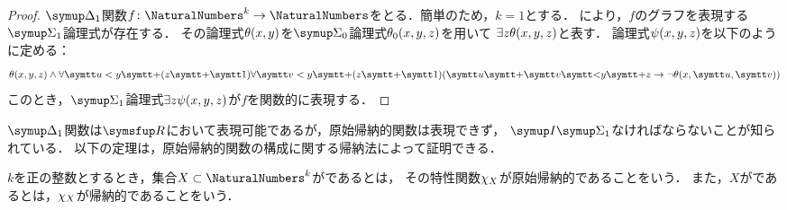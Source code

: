 
\begin{proof}
	\(\DeltaFormula_1\)関数\(f \colon \NaturalNumbers^k \to \NaturalNumbers\)をとる．簡単のため，\(k = 1\)とする．
	により，\(f\)のグラフを表現する\(\SigmaFormula_1\)論理式が存在する．
	その論理式\(\apply{\theta}{x, y}\)を\(\SigmaFormula_0\)論理式\(\apply{\theta_0}{x, y, z}\)を用いて
	\(\exists z \apply{\theta}{x, y, z}\)と表す．
	論理式\(\apply{\psi}{x, y, z}\)を以下のように定める：
	\[
		\apply{\theta}{x, y, z} \land \forall \obj{u} < y \obj{+} \paren{z \obj{+} \obj{1}} \forall \obj{v} < y \obj{+} \paren{z \obj{+} \obj{1}}
		\paren{\obj{u} \obj{+} \obj{v} \obj{<} y \obj{+} z \to \lnot \apply{\theta}{x, \obj{u}, \obj{v}}}
	\]
	このとき，\(\SigmaFormula_1\)論理式\(\exists z \apply{\psi}{x, y, z}\)が\(f\)を関数的に表現する．
\end{proof}

\(\DeltaFormula_1\)関数は\(\RArithmetic\)において表現可能であるが，原始帰納的関数は表現できず，
\(\SigmaFormulaInduction_1\)なければならないことが知られている．
以下の定理は，原始帰納的関数の構成に関する帰納法によって証明できる．


\begin{Def} \label{Def:setrecursive}
	\(k\)を正の整数とするとき，集合\(X \subset \NaturalNumbers^k\)がであるとは，
	その特性関数\(\chi_{X}\)が原始帰納的であることをいう．
	また，\(X\)がであるとは，\(\chi_{X}\)が帰納的であることをいう．
\end{Def}

